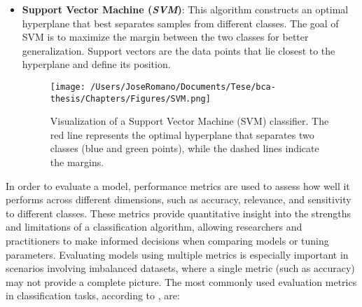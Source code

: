 \begin{itemize}
  \item \textbf{Support Vector Machine (\textit{SVM})}: This algorithm constructs an optimal hyperplane that best separates samples from different classes. The goal of SVM is to maximize the margin between the two classes for better generalization. Support vectors are the data points that lie closest to the hyperplane and define its position.
        \begin{figure} [h]
          \centering
          \texttt{[image: /Users/JoseRomano/Documents/Tese/bca-thesis/Chapters/Figures/SVM.png]}
          \caption{Visualization of a Support Vector Machine (SVM) classifier. The red line represents the optimal hyperplane that separates two classes (blue and green points), while the dashed lines indicate the margins.}
        \end{figure}
\end{itemize}

In order to evaluate a model, performance metrics are used to assess how well
it performs across different dimensions, such as accuracy, relevance, and
sensitivity to different classes. These metrics provide quantitative insight
into the strengths and limitations of a classification algorithm, allowing
researchers and practitioners to make informed decisions when comparing models
or tuning parameters. Evaluating models using multiple metrics is especially
important in scenarios involving imbalanced datasets, where a single metric
(such as accuracy) may not provide a complete picture. The most commonly used
evaluation metrics in classification tasks, according to
\textcite{metrics_models_yaseen2021}, are:

